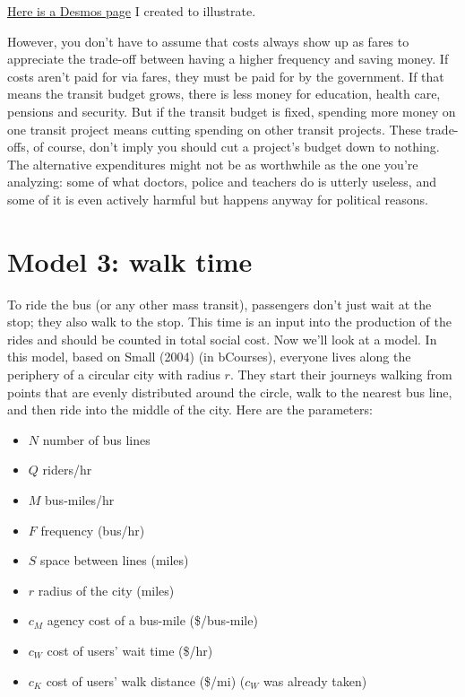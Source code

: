 \documentclass[11pt]{article}
\providecommand{\tightlist}{%
      \setlength{\itemsep}{0pt}\setlength{\parskip}{0pt}}
\begin{document}
\href{https://www.desmos.com/calculator/dokk5s3cqi}{Here is a Desmos
page} I created to illustrate.

However, you don't have to assume that costs always show up as fares to
appreciate the trade-off between having a higher frequency and saving
money. If costs aren't paid for via fares, they must be paid for by the
government. If that means the transit budget grows, there is less money
for education, health care, pensions and security. But if the transit
budget is fixed, spending more money on one transit project means
cutting spending on other transit projects. These trade-offs, of course,
don't imply you should cut a project's budget down to nothing. The
alternative expenditures might not be as worthwhile as the one you're
analyzing: some of what doctors, police and teachers do is utterly
useless, and some of it is even actively harmful but happens anyway for
political reasons.

    \section{Model 3: walk time}\label{model-3-walk-time}

To ride the bus (or any other mass transit), passengers don't just wait
at the stop; they also walk to the stop. This time is an input into the
production of the rides and should be counted in total social cost. Now
we'll look at a model. In this model, based on Small (2004) (in
bCourses), everyone lives along the periphery of a circular city with
radius \(r\). They start their journeys walking from points that are
evenly distributed around the circle, walk to the nearest bus line, and
then ride into the middle of the city. Here are the parameters:

\begin{itemize}
\tightlist
\item
  \(N\) number of bus lines
\item
  \(Q\) riders/hr
\item
  \(M\) bus-miles/hr
\item
  \(F\) frequency (bus/hr)
\item
  \(S\) space between lines (miles)
\item
  \(r\) radius of the city (miles)
\item
  \(c_M\) agency cost of a bus-mile (\$/bus-mile)
\item
  \(c_W\) cost of users' wait time (\$/hr)
\item
  \(c_K\) cost of users' walk distance (\$/mi) (\(c_W\) was already
  taken)
\end{itemize}
\end{document}
